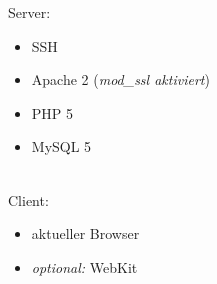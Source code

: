 Server:
\begin{itemize}
    \item SSH
	\item Apache 2 (\textit{mod_ssl aktiviert})
	\item PHP 5
	\item MySQL 5
\end{itemize}
\\
Client: 
\begin{itemize}
	\item aktueller Browser
    \item \textit{optional:} WebKit
\end{itemize}